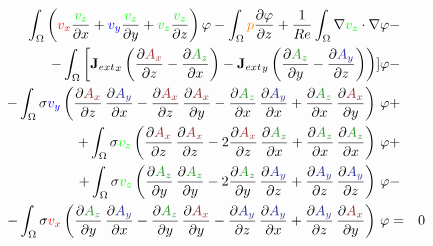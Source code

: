 \documentclass[smallextended]{svjour3}       %
\begin{document}
\begin{eqnarray}
			\int_{\Omega} \left(\textcolor{red}{v_x} \frac{\textcolor{green}{v_z}}{\partial x} + \textcolor{blue}{v_y} \frac{\textcolor{green}{v_z}}{\partial y} + \textcolor{green}{v_z} \frac{\textcolor{green}{v_z}}{\partial z}\right) \varphi
			- \int_{\Omega} \textcolor{orange}{p} \frac{\partial \varphi}{\partial z}
			+ \frac{1}{Re} \int_{\Omega} \nabla \textcolor{green}{v_z} \cdot \nabla \varphi \nonumber & -\\
			- \int_{\Omega} \left[{\mathbf{J}_{ext}}_x \left(\frac{\partial \textcolor{darkRed}{A_x}}{\partial z} - \frac{\partial \textcolor{darkGreen}{A_z}}{\partial x}\right) - {\mathbf{J}_{ext}}_y \left(\frac{\partial \textcolor{darkGreen}{A_z}}{\partial y} - \frac{\partial \textcolor{darkBlue}{A_y}}{\partial z}\right)\right)] \varphi			
			\nonumber & -\\			- \int_{\Omega} \sigma \textcolor{blue}{v_y} \left(\frac{\partial \textcolor{darkRed}{A_x}}{\partial z}\,\frac{\partial \textcolor{darkBlue}{A_y}}{\partial x} - \frac{\partial \textcolor{darkRed}{A_x}}{\partial z}\,\frac{\partial \textcolor{darkRed}{A_x}}{\partial y} - \frac{\partial \textcolor{darkGreen}{A_z}}{\partial x}\,\frac{\partial \textcolor{darkBlue}{A_y}}{\partial x}  + \frac{\partial \textcolor{darkGreen}{A_z}}{\partial x}\,\frac{\partial \textcolor{darkRed}{A_x}}{\partial y} \right)\, \varphi& +\nonumber \\			
			+ \int_{\Omega} \sigma \textcolor{green}{v_z} \left(\frac{\partial \textcolor{darkRed}{A_x}}{\partial z}\,\frac{\partial \textcolor{darkRed}{A_x}}{\partial z} - 2 \frac{\partial \textcolor{darkRed}{A_x}}{\partial z}\,\frac{\partial \textcolor{darkGreen}{A_z}}{\partial x} + \frac{\partial \textcolor{darkGreen}{A_z}}{\partial x}\,\frac{\partial \textcolor{darkGreen}{A_z}}{\partial x} \right)\, \varphi& +\nonumber \\			
			+ \int_{\Omega} \sigma \textcolor{green}{v_z} \left(\frac{\partial \textcolor{darkGreen}{A_z}}{\partial y}\,\frac{\partial \textcolor{darkGreen}{A_z}}{\partial y} - 2 \frac{\partial \textcolor{darkGreen}{A_z}}{\partial y}\,\frac{\partial \textcolor{darkBlue}{A_y}}{\partial z} + \frac{\partial \textcolor{darkBlue}{A_y}}{\partial z}\,\frac{\partial \textcolor{darkBlue}{A_y}}{\partial z} \right)\, \varphi& -\nonumber \\			
			- \int_{\Omega} \sigma \textcolor{red}{v_x} \left(\frac{\partial \textcolor{darkGreen}{A_z}}{\partial y}\,\frac{\partial \textcolor{darkBlue}{A_y}}{\partial x} - \frac{\partial \textcolor{darkGreen}{A_z}}{\partial y}\,\frac{\partial \textcolor{darkRed}{A_x}}{\partial y} - \frac{\partial \textcolor{darkBlue}{A_y}}{\partial z}\,\frac{\partial \textcolor{darkBlue}{A_y}}{\partial x} + \frac{\partial \textcolor{darkBlue}{A_y}}{\partial z}\,\frac{\partial \textcolor{darkRed}{A_x}}{\partial y} \right)\, \varphi& = & 0 \\				

\end{eqnarray}
\end{document}
